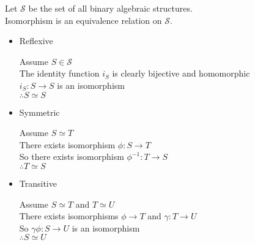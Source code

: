 \documentclass[letterpaper,12pt,fleqn]{article}
\newcommand{\g}{\gamma}
\newcommand{\p}{\phi}
\renewcommand{\S}{\mathscr{S}}
\begin{document}
\begin{theorem}
  Let $\S$ be the set of all binary algebraic structures. \\
  Isomorphism is an equivalence relation on $\S$.
\end{theorem}

\begin{theproof}
  \listbreak
  \begin{itemize}
  \item{Reflexive}

    Assume $S\in\S$ \\
    The identity function $i_S$ is clearly bijective and homomorphic \\
    $i_S:S\to S$ is an isomorphism \\
    $\therefore S\simeq S$

  \item{Symmetric}

    Assume $S\simeq T$ \\
    There exists isomorphism $\p:S\to T$ \\
    So there exists isomorphism $\p^{-1}:T\to S$ \\
    $\therefore T\simeq S$

  \item{Transitive}

    Assume $S\simeq T$ and $T\simeq U$ \\
    There exists isomorphisms $\p\to T$ and $\g:T\to U$ \\
    So $\g\p:S\to U$ is an isomorphism \\
    $\therefore S\simeq U$
  \end{itemize}
\end{theproof}
\end{document}
